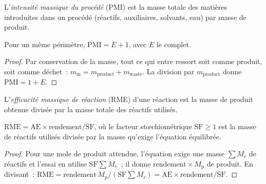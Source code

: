 \begin{definition}\label{def:b3:green-industrial:pmi}
L'\emph{intensité massique du procédé} (PMI) est la masse
totale des matières introduites dans un procédé (réactifs, auxiliaires,
solvants, eau) par masse de produit.
\end{definition}

\begin{proposition}\label{prop:b3:green-industrial:pmi-e}
Pour un même périmètre, $\mathrm{PMI} = E + 1$, avec $E$ le  complet.
\end{proposition}

\begin{proof}
Par conservation de la masse, tout ce qui entre ressort soit comme produit, soit comme déchet~:
$m_{\mathrm{in}} = m_{\mathrm{product}} + m_{\mathrm{waste}}$. La division par $m_{\mathrm{product}}$ donne $\mathrm{PMI} = 1 + E$.
\end{proof}

\begin{definition}\label{def:b3:green-industrial:rme}
L'\emph{efficacité massique de réaction} (RME) d'une
réaction est la masse de produit obtenue divisée par la masse totale des
réactifs utilisés.
\end{definition}

\begin{proposition}\label{prop:b3:green-industrial:rme}
$\mathrm{RME} = \mathrm{AE} \times \text{rendement}/\mathrm{SF}$, où le facteur stœchiométrique $\mathrm{SF} \ge 1$ est la masse de
réactifs utilisés divisée par la masse qu'exige l'équation équilibrée.
\end{proposition}

\begin{proof}
Pour une mole de produit attendue, l'équation exige une masse $\sum M_r$ de réactifs et
l'essai en utilise $\mathrm{SF}\sum M_r$~; il donne $\text{rendement} \times M_{\mathrm p}$ de produit. En divisant~:
$\mathrm{RME} = \text{rendement}\,M_{\mathrm p}/(\mathrm{SF}\sum M_r) = \mathrm{AE} \times \text{rendement}/\mathrm{SF}$.
\end{proof}

